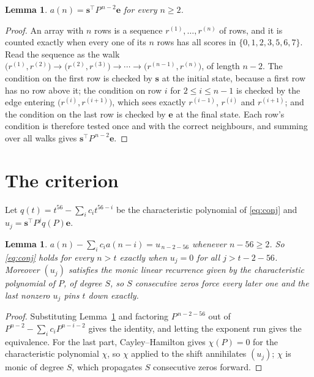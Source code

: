 \documentclass[11pt,a4paper]{article}
\theoremstyle{plain}
\newtheorem{lemma}[theorem]{Lemma}
\theoremstyle{definition}
\begin{document}
\begin{lemma}\label{lem:walk}
$a(n)=\mathbf{s}^{\!\top}P^{\,n-2}\mathbf{e}$ for every $n\ge2$.
\end{lemma}

\begin{proof}
An array with $n$ rows is a sequence $r^{(1)},\dots,r^{(n)}$ of rows, and it is counted
exactly when every one of its $n$ rows has all scores in $\{0,1,2,3,5,6,7\}$. Read the sequence as the
walk $\bigl(r^{(1)},r^{(2)}\bigr)\to\bigl(r^{(2)},r^{(3)}\bigr)\to\cdots\to
\bigl(r^{(n-1)},r^{(n)}\bigr)$, of length $n-2$. The condition on the first row is
checked by $\mathbf{s}$ at the initial state, because a first row has no row above it; the
condition on row $i$ for $2\le i\le n-1$ is checked by the edge entering
$\bigl(r^{(i)},r^{(i+1)}\bigr)$, which sees exactly $r^{(i-1)}$, $r^{(i)}$ and
$r^{(i+1)}$; and the condition on the last row is checked by $\mathbf{e}$ at the final
state. Each row's condition is therefore tested once and with the correct neighbours, and
summing over all walks gives $\mathbf{s}^{\!\top}P^{\,n-2}\mathbf{e}$.
\end{proof}

\section{The criterion}

Let $q(t)=t^{56}-\sum_i c_i t^{56-i}$ be the characteristic polynomial of
\eqref{eq:conj} and $u_j=\mathbf{s}^{\!\top}P^{j}q(P)\mathbf{e}$.

\begin{lemma}\label{lem:crit}
$a(n)-\sum_i c_i a(n-i)=u_{\,n-2-56}$ whenever $n-56\ge2$. So \eqref{eq:conj}
holds for every $n>t$ exactly when $u_j=0$ for all $j>t-2-56$. Moreover $(u_j)$
satisfies the monic linear recurrence given by the characteristic polynomial of $P$, of
degree $S$, so $S$ consecutive zeros force every later one and the last nonzero $u_j$ pins
$t$ down exactly.
\end{lemma}

\begin{proof}
Substituting Lemma~\ref{lem:walk} and factoring $P^{\,n-2-56}$ out of
$P^{n-2}-\sum_i c_i P^{n-i-2}$ gives the identity, and letting the exponent run gives the
equivalence. For the last part, Cayley--Hamilton gives $\chi(P)=0$ for the characteristic
polynomial $\chi$, so $\chi$ applied to the shift annihilates $(u_j)$; $\chi$ is monic of
degree $S$, which propagates $S$ consecutive zeros forward.
\end{proof}
\end{document}
